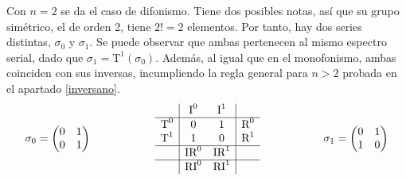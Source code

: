 		Con $n=2$ se da el caso de difonismo. Tiene dos posibles notas, así que su grupo simétrico, el de orden 2, tiene $2!=2$ elementos. Por tanto, hay dos series distintas, $\sigma_0$ y $\sigma_1$. Se puede observar que ambas pertenecen al mismo espectro serial, dado que $\sigma_1=\text{T}^1(\sigma_0)$. Además, al igual que en el monofonismo, ambas coinciden con sus inversas, incumpliendo la regla general para $n>2$ probada en el apartado \ref{inversano}.
		$$\sigma_0=\left(\begin{matrix}0&1\\0&1\end{matrix}\right) \hspace{2cm}\begin{array}{l|cc|r}&\text{I}^{0}&\text{I}^{1}&\\\hline\text{T}^{0}&0&1&\text{R}^{0}\\\text{T}^{1}&1&0&\text{R}^{1}\\\hline&\text{IR}^{0}&\text{IR}^{1}&\\\hline&\text{RI}^{0}&\text{RI}^{1}&\end{array}\hspace{2cm} \sigma_1=\left(\begin{matrix}0&1\\1&0\end{matrix}\right)$$